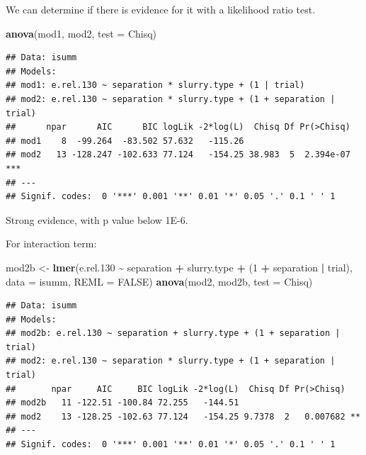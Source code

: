 \documentclass[
]{article}
\newenvironment{Shaded}{\begin{snugshade}}{\end{snugshade}}
\newcommand{\AttributeTok}[1]{\textcolor[rgb]{0.13,0.29,0.53}{#1}}
\newcommand{\ConstantTok}[1]{\textcolor[rgb]{0.56,0.35,0.01}{#1}}
\newcommand{\DecValTok}[1]{\textcolor[rgb]{0.00,0.00,0.81}{#1}}
\newcommand{\FloatTok}[1]{\textcolor[rgb]{0.00,0.00,0.81}{#1}}
\newcommand{\FunctionTok}[1]{\textcolor[rgb]{0.13,0.29,0.53}{\textbf{#1}}}
\newcommand{\NormalTok}[1]{#1}
\newcommand{\OtherTok}[1]{\textcolor[rgb]{0.56,0.35,0.01}{#1}}
\newcommand{\SpecialCharTok}[1]{\textcolor[rgb]{0.81,0.36,0.00}{\textbf{#1}}}
\newcommand{\StringTok}[1]{\textcolor[rgb]{0.31,0.60,0.02}{#1}}
\begin{document}
We can determine if there is evidence for it with a likelihood ratio
test.

\begin{Shaded}
\begin{Highlighting}[]
\FunctionTok{anova}\NormalTok{(mod1, mod2, }\AttributeTok{test =} \StringTok{\textquotesingle{}Chisq\textquotesingle{}}\NormalTok{)}
\end{Highlighting}
\end{Shaded}

\begin{verbatim}
## Data: isumm
## Models:
## mod1: e.rel.130 ~ separation * slurry.type + (1 | trial)
## mod2: e.rel.130 ~ separation * slurry.type + (1 + separation | trial)
##      npar      AIC      BIC logLik -2*log(L)  Chisq Df Pr(>Chisq)    
## mod1    8  -99.264  -83.502 57.632   -115.26                         
## mod2   13 -128.247 -102.633 77.124   -154.25 38.983  5  2.394e-07 ***
## ---
## Signif. codes:  0 '***' 0.001 '**' 0.01 '*' 0.05 '.' 0.1 ' ' 1
\end{verbatim}

Strong evidence, with p value below 1E-6.

For interaction term:

\begin{Shaded}
\begin{Highlighting}[]
\NormalTok{mod2b }\OtherTok{\textless{}{-}} \FunctionTok{lmer}\NormalTok{(e.rel}\FloatTok{.130} \SpecialCharTok{\textasciitilde{}}\NormalTok{ separation }\SpecialCharTok{+}\NormalTok{ slurry.type }\SpecialCharTok{+}\NormalTok{ (}\DecValTok{1} \SpecialCharTok{+}\NormalTok{ separation }\SpecialCharTok{|}\NormalTok{ trial), }\AttributeTok{data =}\NormalTok{ isumm, }\AttributeTok{REML =} \ConstantTok{FALSE}\NormalTok{)}
\FunctionTok{anova}\NormalTok{(mod2, mod2b, }\AttributeTok{test =} \StringTok{\textquotesingle{}Chisq\textquotesingle{}}\NormalTok{)}
\end{Highlighting}
\end{Shaded}

\begin{verbatim}
## Data: isumm
## Models:
## mod2b: e.rel.130 ~ separation + slurry.type + (1 + separation | trial)
## mod2: e.rel.130 ~ separation * slurry.type + (1 + separation | trial)
##       npar     AIC     BIC logLik -2*log(L)  Chisq Df Pr(>Chisq)   
## mod2b   11 -122.51 -100.84 72.255   -144.51                        
## mod2    13 -128.25 -102.63 77.124   -154.25 9.7378  2   0.007682 **
## ---
## Signif. codes:  0 '***' 0.001 '**' 0.01 '*' 0.05 '.' 0.1 ' ' 1
\end{verbatim}
\end{document}
